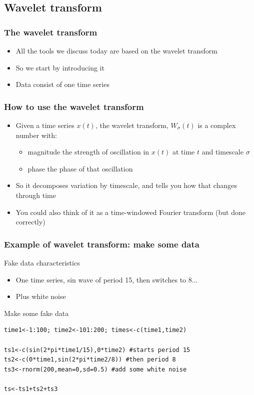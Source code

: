 \documentclass{beamer}
\begin{document}
\subsection{Wavelet transform}

{
\begin{frame}
\frametitle{The wavelet transform}
\begin{itemize}
\item All the tools we discuss today are based on the wavelet transform
\item So we start by introducing it
\item Data consist of one time series
\end{itemize}
\end{frame}}

\begin{frame}
\frametitle{How to use the wavelet transform}
\begin{itemize}
\item Given a time series $x(t)$, the wavelet transform, $W_{\sigma}(t)$ is a complex number with:
\begin{itemize}
\item magnitude the strength of oscillation in $x(t)$ at time $t$ and timescale $\sigma$
\item phase the phase of that oscillation
\end{itemize}
\item So it decomposes variation by timescale, and tells you how that changes through time
\item You could also think of it as a time-windowed Fourier transform (but done correctly)
\end{itemize}
\end{frame}

\begin{frame}[fragile]
\frametitle{Example of wavelet transform: make some data}
\begin{block}{Fake data characteristics}
\begin{itemize}
\item One time series, sin wave of period 15, then switches to 8...
\item Plus white noise
\end{itemize}
\end{block}
\begin{exampleblock}{Make some fake data}
\begin{verbatim}
time1<-1:100; time2<-101:200; times<-c(time1,time2)

ts1<-c(sin(2*pi*time1/15),0*time2) #starts period 15
ts2<-c(0*time1,sin(2*pi*time2/8)) #then period 8
ts3<-rnorm(200,mean=0,sd=0.5) #add some white noise

ts<-ts1+ts2+ts3 
\end{verbatim}
\end{exampleblock}
\end{frame}
\end{document}
